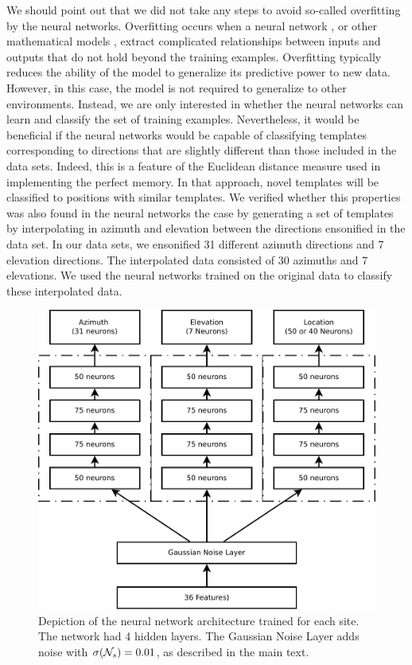 \documentclass[preprint,5p]{elsarticle}
\begin{document}
We should point out that we did not take any steps to avoid so-called overfitting by the neural networks. Overfitting occurs when a neural network \citep{Ghotra2017}, or other mathematical models \citep{Hawkins2004}, extract complicated relationships between inputs and outputs that do not hold beyond the training examples. Overfitting typically reduces the ability of the model to generalize its predictive power to new data. However, in this case, the model is not required to generalize to other environments. Instead, we are only interested in whether the neural networks can learn and classify the set of training examples. Nevertheless, it would be beneficial if the neural networks would be capable of classifying templates corresponding to directions that are slightly different than those included in the data sets. Indeed, this is a feature of the Euclidean distance measure used in implementing the perfect memory. In that approach, novel templates will be classified to positions with similar templates. We verified whether this properties was also found in the neural networks the case by generating a set of templates by interpolating in azimuth and elevation between the directions ensonified in the data set. In our data sets, we ensonified 31 different azimuth directions and 7 elevation directions. The interpolated data consisted of 30 azimuths and 7 elevations. We used the neural networks trained on the original data to classify these interpolated data. 

\begin{figure}
	\centering
	\includegraphics[width=1\linewidth]{figures/networks}
	\caption{Depiction of the neural network architecture trained for each site. The network had 4 hidden layers. The Gaussian Noise Layer adds noise with $\sigma(\mathcal{N}_s) = 0.01$, as described in the main text.}
	\label{fig:networks}
\end{figure}
\end{document}
